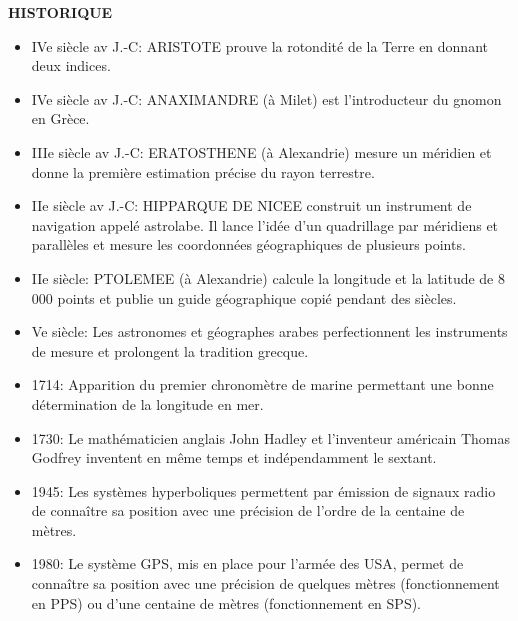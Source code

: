 
\textbf{HISTORIQUE}
\begin{itemize}
\item IVe siècle av J.-C: ARISTOTE prouve la rotondité de la Terre en donnant deux
indices.
\item IVe siècle av J.-C: ANAXIMANDRE (à Milet) est l’introducteur du gnomon en
Grèce.
\item IIIe siècle av J.-C: ERATOSTHENE (à Alexandrie) mesure un méridien et donne la
première estimation précise du rayon terrestre.
\item IIe siècle av J.-C: HIPPARQUE DE NICEE construit un instrument de navigation appelé astrolabe. Il lance l’idée d’un quadrillage par méridiens et
parallèles et mesure les coordonnées géographiques de plusieurs
points.
\item IIe siècle: PTOLEMEE (à Alexandrie) calcule la longitude et la latitude de
8 000 points et publie un guide géographique copié pendant des
siècles.
\item Ve siècle: Les astronomes et géographes arabes perfectionnent les instruments
de mesure et prolongent la tradition grecque.
\item 1714: Apparition du premier chronomètre de marine permettant une
bonne détermination de la longitude en mer.
\item 1730: Le mathématicien anglais John Hadley et l'inventeur américain
Thomas Godfrey inventent en même temps et indépendamment le
sextant.
\item 1945: Les systèmes hyperboliques permettent par émission de signaux
radio de connaître sa position avec une précision de l’ordre de la
centaine de mètres.
\item 1980: Le système GPS, mis en place pour l'armée des USA, permet de
connaître sa position avec une précision de quelques mètres
(fonctionnement en PPS) ou d'une centaine de mètres
(fonctionnement en SPS).
\end{itemize}